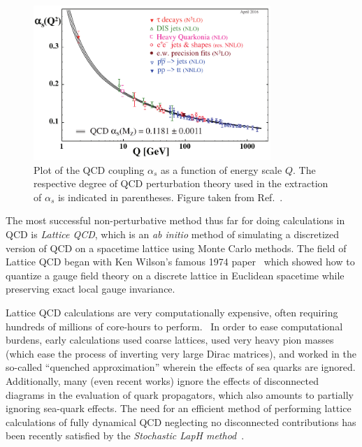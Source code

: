 \begin{figure}
    \centering
    \hspace*{-0.1in}\includegraphics[width=0.8\textwidth]{figures/alpha_s.pdf}
    \caption[Plot of the QCD coupling $\alpha_s$ as a function of energy scale $Q$.]{Plot of the QCD coupling $\alpha_s$ as a function of energy scale $Q$. The respective degree of QCD perturbation theory used in the extraction of $\alpha_s$ is indicated in parentheses. Figure taken from Ref.~\cite{PhysRevD.98.030001}.}\label{fig:alpha_s}
\end{figure}

The most successful non-perturbative method thus far for doing calculations in QCD is \emph{Lattice QCD}, which is an \emph{ab initio} method of simulating a discretized version of QCD on a spacetime lattice using Monte Carlo methods. The field of Lattice QCD began with Ken Wilson's famous 1974 paper~\cite{Wilson:1974sk} which showed how to quantize a gauge field theory on a discrete lattice in Euclidean spacetime while preserving exact local gauge invariance.

Lattice QCD calculations are very computationally expensive, often requiring hundreds of millions of core-hours to perform.~\cite{Fallica2018} In order to ease computational burdens, early calculations used coarse lattices, used very heavy pion masses (which ease the process of inverting very large Dirac matrices), and worked in the so-called ``quenched approximation'' wherein the effects of sea quarks are ignored. Additionally, many (even recent works) ignore the effects of disconnected diagrams in the evaluation of quark propagators, which also amounts to partially ignoring sea-quark effects. The need for an efficient method of performing lattice calculations of fully dynamical QCD neglecting no disconnected contributions has been recently satisfied by the \emph{Stochastic LapH method}~\cite{Morningstar:2011ka}.

